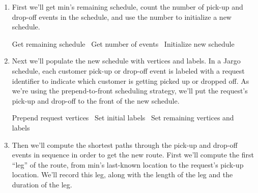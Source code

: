 \begin{enumerate}

\item First we'll get {\Tt{}min\nwendquote}'s remaining schedule, count the number of
pick-up and drop-off events in the schedule, and use the number to initialize
a new schedule.

\nwenddocs{}\plusendmoddef\nwstartdeflinemarkup{}\nwenddeflinemarkup
  \LA{}Get remaining schedule~{\nwtagstyle{}}\RA{}
  \LA{}Get number of events~{\nwtagstyle{}}\RA{}
  \LA{}Initialize new schedule~{\nwtagstyle{}}\RA{}
\nwendcode{}%
%
\item Next we'll populate the new schedule with vertices and labels. In a Jargo
schedule, each customer pick-up or drop-off event is labeled with a request
identifier to indicate which customer is getting picked up or dropped off.
As we're using the prepend-to-front scheduling strategy, we'll
put the request's pick-up and drop-off to the front of the new schedule.

\nwenddocs{}\plusendmoddef\nwstartdeflinemarkup{}\nwenddeflinemarkup
  \LA{}Prepend request vertices~{\nwtagstyle{}}\RA{}
  \LA{}Set initial labels~{\nwtagstyle{}}\RA{}
  \LA{}Set remaining vertices and labels~{\nwtagstyle{}}\RA{}
\nwendcode{}%
%
\item Then we'll compute the shortest paths through the pick-up and drop-off
events in sequence in order to get the new route. First we'll compute the first
``leg'' of the route, from {\Tt{}min\nwendquote}'s last-known location to the request's
pick-up location. We'll record this leg, along with the length of the leg and
the duration of the leg.


\end{enumerate}
